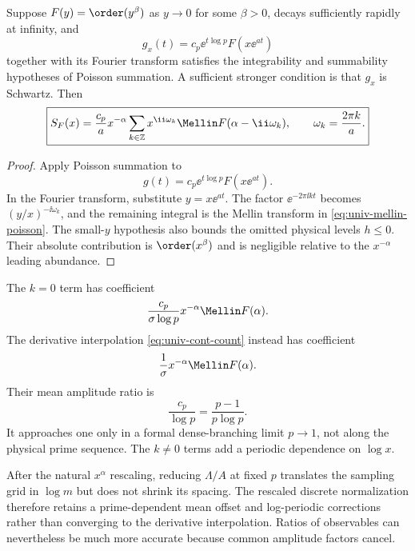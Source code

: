 \begin{theorem}
Suppose $F(y)=\order(y^\beta)$ as $y\to0$ for some $\beta>0$, decays sufficiently rapidly at infinity, and
\begin{equation}
g_x(t)=c_p\ee^{t\log p}F(x\ee^{at})
\end{equation}
together with its Fourier transform satisfies the integrability and summability hypotheses of Poisson summation.  A sufficient stronger condition is that $g_x$ is Schwartz.  Then
\begin{equation}
\boxed{
S_F(x)
=\frac{c_p}{a}x^{-\alpha}
\sum_{k\in\mathbb Z}
x^{\ii\omega_k}
\Mellin F(\alpha-\ii\omega_k),
\qquad
\omega_k=\frac{2\pi k}{a}.}
\label{eq:univ-mellin-poisson}
\end{equation}
\end{theorem}

\begin{proof}
Apply Poisson summation to
\begin{equation}
g(t)=c_p\ee^{t\log p}F(x\ee^{at}).
\end{equation}
In the Fourier transform, substitute $y=x\ee^{at}$.  The factor $\ee^{-2\pi\ii kt}$ becomes $(y/x)^{-\ii\omega_k}$, and the remaining integral is the Mellin transform in \eqref{eq:univ-mellin-poisson}.  The small-$y$ hypothesis also bounds the omitted physical levels $h\le0$.  Their absolute contribution is $\order(x^\beta)$ and is negligible relative to the $x^{-\alpha}$ leading abundance.
\end{proof}

The $k=0$ term has coefficient
\begin{equation}
\frac{c_p}{\sigma\log p}x^{-\alpha}\Mellin F(\alpha).
\label{eq:univ-zero-harmonic}
\end{equation}
The derivative interpolation \eqref{eq:univ-cont-count} instead has coefficient
\begin{equation}
\frac1\sigma x^{-\alpha}\Mellin F(\alpha).
\end{equation}
Their mean amplitude ratio is
\begin{equation}
\boxed{
\frac{c_p}{\log p}
=\frac{p-1}{p\log p}.}
\label{eq:univ-amplitude-ratio}
\end{equation}
It approaches one only in a formal dense-branching limit $p\to1$, not along the physical prime sequence.  The $k\ne0$ terms add a periodic dependence on $\log x$.

\begin{corollary}
After the natural $x^\alpha$ rescaling, reducing $\Lambda/A$ at fixed $p$ translates the sampling grid in $\log m$ but does not shrink its spacing.  The rescaled discrete normalization therefore retains a prime-dependent mean offset and log-periodic corrections rather than converging to the derivative interpolation.  Ratios of observables can nevertheless be much more accurate because common amplitude factors cancel.
\end{corollary}

